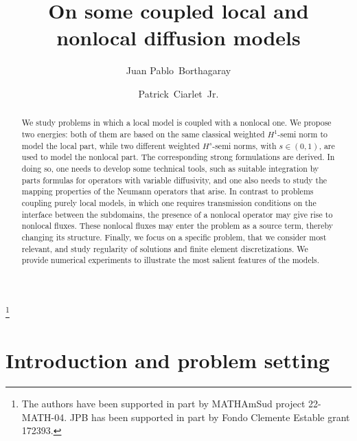 \documentclass{amsart}
\theoremstyle{plain}
\numberwithin{equation}{section}
\numberwithin{table}{section}
\numberwithin{figure}{section}
\numberwithin{theorem}{section}
\numberwithin{corollary}{section}
\numberwithin{definition}{section}
\numberwithin{lemma}{section}
\numberwithin{proposition}{section}
\numberwithin{remark}{section}
\begin{document}
\title[]{On some coupled local and nonlocal diffusion models}
\author[J.P.~Borthagaray]{Juan Pablo~Borthagaray}
\address[J.P.~Borthagaray]{Instituto de Matem\'atica y Estad\'istica Rafael Laguardia, Universidad de la Rep\'ublica \\ 565 Julio Herrera y Reissig, 11300 Montevideo, Uruguay}
\thanks{The authors have been supported in part by MATHAmSud project 22-MATH-04. JPB has been supported in part by Fondo Clemente Estable grant 172393.}

\author[P.~Ciarlet~Jr.]{Patrick~Ciarlet~Jr.}
\address[P.~Ciarlet~Jr.]{POEMS, CNRS, Inria, ENSTA, Institut Polytechnique de Paris\\ 828 Boulevard des Mar\'{e}chaux, 91120 Palaiseau, France}
\begin{abstract}
We study problems in which a local model is coupled with a nonlocal one.  We propose two energies: both of them are based on the same classical weighted $H^1$-semi norm to model the local part, while two different weighted $H^s$-semi norms, with $s \in (0,1)$,
are used to model the nonlocal part. The corresponding strong formulations are derived. In doing so, one needs to develop some technical tools, such as suitable integration by parts formulas for operators with variable diffusivity, and one also needs to study the mapping properties of the Neumann operators that arise.
In contrast to problems coupling purely local models, in which one requires transmission conditions on the interface between the subdomains, the presence of a nonlocal operator may give rise to nonlocal fluxes. These nonlocal fluxes may enter the problem as a source term, thereby changing its structure. Finally, we focus on a specific problem, that we consider most relevant, and study regularity of solutions and finite element discretizations. We provide numerical experiments to illustrate the most salient features of the models.
\end{abstract}

\maketitle 

\section{Introduction and problem setting}
\end{document}
